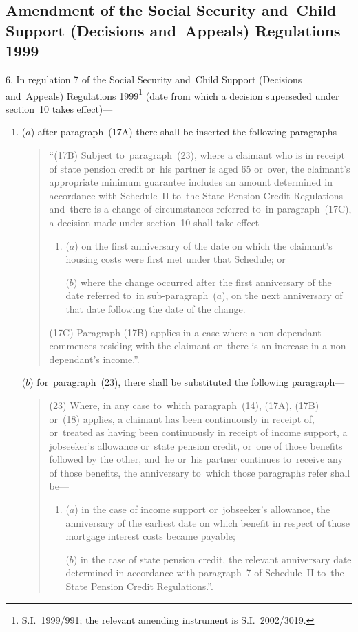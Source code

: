 \documentclass[12pt,a4paper]{article}
\begin{document}
\subsection[6. Amendment of the Social Security and~Child Support (Decisions and~Appeals) Regulations 1999]{Amendment of the Social Security and~Child Support (Decisions and~Appeals) Regulations 1999}

6.  In regulation 7 of the Social Security and~Child Support (Decisions and~Appeals) Regulations 1999\footnote{S.I.~1999/991; the relevant amending instrument is S.I.~2002/3019.} (date from which a decision superseded under section~10 takes effect)—
\begin{enumerate}\item[]
($a$) after paragraph~(17A) there shall be inserted the following paragraphs—
\begin{quotation}
“(17B) Subject to~paragraph~(23), where a claimant who is in receipt of state pension credit or~his partner is aged 65 or~over, the claimant’s appropriate minimum guarantee includes an amount determined in accordance with Schedule~II to~the State Pension Credit Regulations and~there is a change of circumstances referred to~in paragraph~(17C), a decision made under section~10 shall take effect—
\begin{enumerate}\item[]
($a$) on the first anniversary of the date on which the claimant’s housing costs were first met under that Schedule; or

($b$) where the change occurred after the first anniversary of the date referred to~in sub-paragraph~($a$), on the next anniversary of that date following the date of the change.
\end{enumerate}

(17C) Paragraph (17B) applies in a case where a non-dependant commences residing with the claimant or~there is an increase in a non-dependant’s income.”.
\end{quotation}

($b$) for~paragraph~(23), there shall be substituted the following paragraph—
\begin{quotation}
(23) Where, in any case to~which paragraph~(14), (17A), (17B) or~(18) applies, a claimant has been continuously in receipt of, or~treated as having been continuously in receipt of income support, a jobseeker’s allowance or~state pension credit, or~one of those benefits followed by the other, and~he or~his partner continues to~receive any of those benefits, the anniversary to~which those paragraphs refer shall be—
\begin{enumerate}\item[]
($a$) in the case of income support or~jobseeker’s allowance, the anniversary of the earliest date on which benefit in respect of those mortgage interest costs became payable;

($b$) in the case of state pension credit, the relevant anniversary date determined in accordance with paragraph~7 of Schedule~II to~the State Pension Credit Regulations.”.
\end{enumerate}
\end{quotation}
\end{enumerate}
\end{document}
